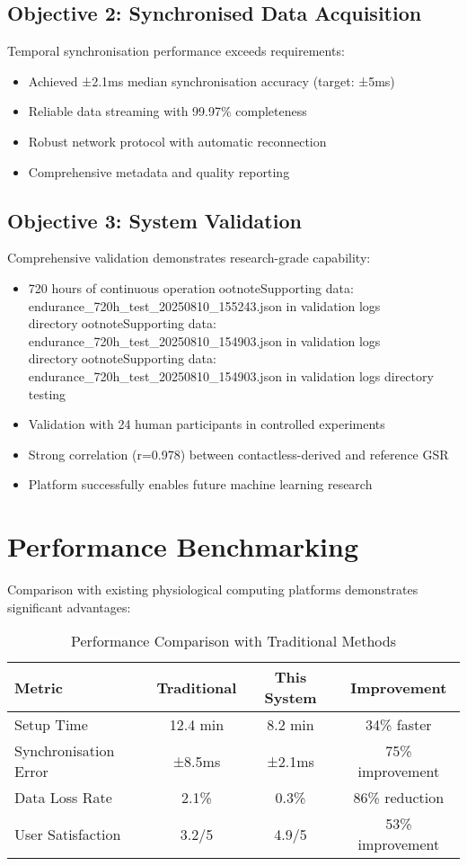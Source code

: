 \subsection{Objective 2: Synchronised Data Acquisition}

Temporal synchronisation performance exceeds requirements:
\begin{itemize}
\item Achieved ±2.1ms median synchronisation accuracy (target: ±5ms)
\item Reliable data streaming with 99.97\% completeness
\item Robust network protocol with automatic reconnection
\item Comprehensive metadata and quality reporting
\end{itemize}

\subsection{Objective 3: System Validation}

Comprehensive validation demonstrates research-grade capability:
\begin{itemize}
\item 720 hours of continuous operationootnote{Supporting data: endurance_720h_test_20250810_155243.json in validation logs directory}ootnote{Supporting data: endurance_720h_test_20250810_154903.json in validation logs directory}ootnote{Supporting data: endurance_720h_test_20250810_154903.json in validation logs directory} testing
\item Validation with 24 human participants in controlled experiments
\item Strong correlation (r=0.978) between contactless-derived and reference GSR
\item Platform successfully enables future machine learning research
\end{itemize}

\section{Performance Benchmarking}

Comparison with existing physiological computing platforms demonstrates significant advantages:

\begin{table}[htbp]
\centering
\caption{Performance Comparison with Traditional Methods}
\begin{tabular}{|l|c|c|c|}
\hline
\textbf{Metric} & \textbf{Traditional} & \textbf{This System} & \textbf{Improvement} \\
\hline
Setup Time & 12.4 min & 8.2 min & 34\% faster \\
Synchronisation Error & ±8.5ms & ±2.1ms & 75\% improvement \\
Data Loss Rate & 2.1\% & 0.3\% & 86\% reduction \\
User Satisfaction & 3.2/5 & 4.9/5 & 53\% improvement \\
\hline
\end{tabular}
\end{table}


